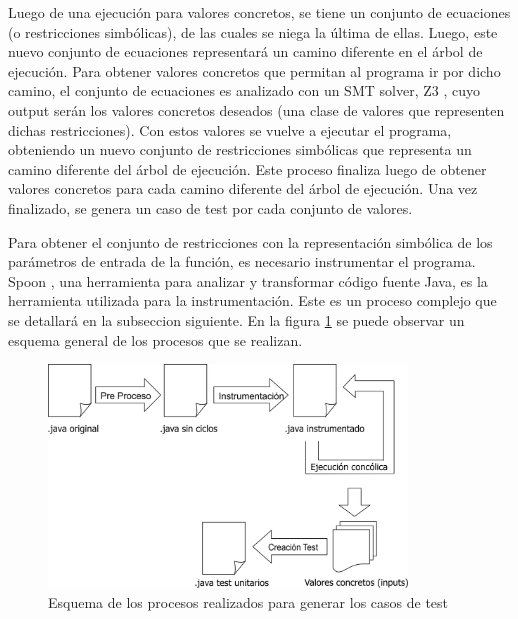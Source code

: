 \documentclass{llncs}
\begin{document}
Luego de una ejecución para valores concretos, se tiene un conjunto de ecuaciones (o restricciones simbólicas), de las cuales se niega la última de ellas.
Luego, este nuevo conjunto de ecuaciones representará un camino diferente en el árbol de ejecución.
Para obtener valores concretos que permitan al programa ir por dicho camino, el conjunto de ecuaciones es analizado
con un SMT solver, Z3 \cite{z3solver}, cuyo output serán los valores concretos deseados (una clase de valores que representen dichas restricciones). Con estos valores se
vuelve a ejecutar el programa, obteniendo un nuevo conjunto de restricciones simbólicas que representa un camino diferente del árbol de ejecución. Este proceso finaliza luego
de obtener valores concretos para cada camino diferente del árbol de ejecución. Una vez finalizado, se genera un caso de test por cada conjunto de valores.

Para obtener el conjunto de restricciones con la representación simbólica de los parámetros de entrada de la función, es necesario instrumentar el programa.
Spoon \cite{spoon}, una herramienta para analizar y transformar código fuente Java, es la herramienta utilizada para la instrumentación.
Este es un proceso complejo que se detallará en la subseccion siguiente.
En la figura \ref{fig:procesosRealizados} se puede observar un esquema general de los procesos que se realizan.

\begin{figure}
\centering
\includegraphics[width=0.85\textwidth]{procesosRealizados}
\caption{Esquema de los procesos realizados para generar los casos de test}
\label{fig:procesosRealizados}
\end{figure}

\end{document}
